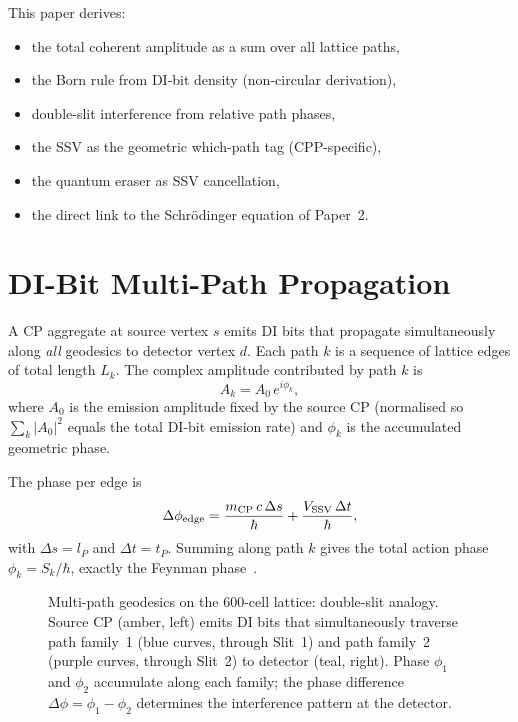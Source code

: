 \documentclass[11pt,a4paper]{article}
\newcommand{\lP}{l_P}
\newcommand{\tP}{t_P}
\begin{document}
This paper derives:
\begin{itemize}
\item the total coherent amplitude as a sum over all lattice paths,
\item the Born rule from DI-bit density (non-circular derivation),
\item double-slit interference from relative path phases,
\item the SSV as the geometric which-path tag (CPP-specific),
\item the quantum eraser as SSV cancellation,
\item the direct link to the Schr\"{o}dinger equation of Paper~2.
\end{itemize}

\section{DI-Bit Multi-Path Propagation}

A CP aggregate at source vertex $s$ emits DI bits that propagate
simultaneously along \emph{all} geodesics to detector vertex $d$.
Each path $k$ is a sequence of lattice edges of total length $L_k$.
The complex amplitude contributed by path $k$ is
\begin{equation}
A_k = A_0\,e^{i\phi_k},
\label{eq:Ak}
\end{equation}
where $A_0$ is the emission amplitude fixed by the source CP
(normalised so $\sum_k|A_0|^2$ equals the total DI-bit emission
rate) and $\phi_k$ is the accumulated geometric phase.

The phase per edge is
\begin{equation}
\Delta\phi_{\rm edge}
= \frac{m_{\rm CP}\,c\,\Delta s}{\hbar}
+ \frac{V_{\rm SSV}\,\Delta t}{\hbar},
\label{eq:phaseedge}
\end{equation}
with $\Delta s = \lP$ and $\Delta t = \tP$.  Summing along path $k$
gives the total action phase $\phi_k = S_k/\hbar$, exactly the
Feynman phase~\cite{feynman1965}.

\begin{figure}[H]
\centering

\caption{Multi-path geodesics on the 600-cell lattice: double-slit
  analogy.  Source CP (amber, left) emits DI bits that simultaneously
  traverse path family~1 (blue curves, through Slit~1) and path
  family~2 (purple curves, through Slit~2) to detector (teal, right).
  Phase $\phi_1$ and $\phi_2$ accumulate along each family; the phase
  difference $\Delta\phi = \phi_1 - \phi_2$ determines the interference
  pattern at the detector.}
\label{fig:geodesics}
\end{figure}
\end{document}
